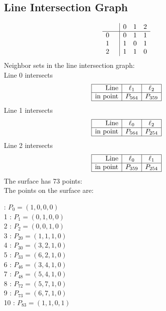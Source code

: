\documentclass{article}
\begin{document}
{\subsection*{Line Intersection Graph}
{\arraycolsep=1pt
$$
\begin{array}{rr|*{3}r}
 &  & 0 & 1 & 2\\
\hline
0 &  & 0 & 1 & 1\\
1 &  & 1 & 0 & 1\\
2 &  & 1 & 1 & 0\\
\end{array}
$$
}%
Neighbor sets in the line intersection graph:\\
Line 0 intersects 
$$
\begin{array}{|r*{2}{|c}|}
\hline
\mbox{Line}  & \ell_{1} & \ell_{2}\\
\hline
\mbox{in point}  & P_{564} & P_{359}\\
\hline
\end{array}
$$
Line 1 intersects 
$$
\begin{array}{|r*{2}{|c}|}
\hline
\mbox{Line}  & \ell_{0} & \ell_{2}\\
\hline
\mbox{in point}  & P_{564} & P_{254}\\
\hline
\end{array}
$$
Line 2 intersects 
$$
\begin{array}{|r*{2}{|c}|}
\hline
\mbox{Line}  & \ell_{0} & \ell_{1}\\
\hline
\mbox{in point}  & P_{359} & P_{254}\\
\hline
\end{array}
$$
The surface has 73 points:\\
The points on the surface are:\\
\begin{multicols}{3}
 : $P_{0}=( 1, 0, 0, 0 )$\\
1 : $P_{1}=( 0, 1, 0, 0 )$\\
2 : $P_{2}=( 0, 0, 1, 0 )$\\
3 : $P_{20}=( 1, 1, 1, 0 )$\\
4 : $P_{30}=( 3, 2, 1, 0 )$\\
5 : $P_{33}=( 6, 2, 1, 0 )$\\
6 : $P_{46}=( 3, 4, 1, 0 )$\\
7 : $P_{48}=( 5, 4, 1, 0 )$\\
8 : $P_{72}=( 5, 7, 1, 0 )$\\
9 : $P_{73}=( 6, 7, 1, 0 )$\\
10 : $P_{83}=( 1, 1, 0, 1 )$\\

\end{multicols}}
\end{document}
